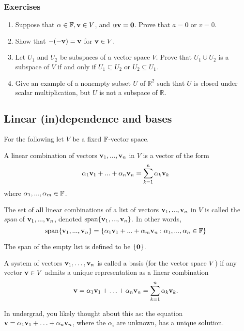 \documentclass{article}
\begin{document}
\subsubsection{Exercises}
\begin{enumerate}
    \item Suppose that $\alpha\in{\mathbb{F}}, {\mathbf{v}}\in V$, and $\alpha {\mathbf{v}}={\mathbf{0}}$. Prove that $a=0$
or $v=0$.
\item Show that $-(-{\mathbf{v}})={\mathbf{v}}$ for ${\mathbf{v}}\in V$.
\item Let $U_1$ and $U_2$ be subspaces of a vector space $V$. Prove that $U_1 \cup U_2$ is a subspace of $V$ if and only if $U_1 \subseteq U_2$ or $U_2 \subseteq U_1$.
\item Give an example of a nonempty subset $U$ of $\mathbb{R}^{2}$ such that $U$ is closed under scalar
multiplication, but $U$ is not a subspace of $\mathbb{R}$.
\end{enumerate}


\subsection{Linear (in)dependence and bases}
For the following let $V$ be a fixed ${\mathbb{F}}$-vector space.

\begin{definition}
A linear combination of vectors ${\mathbf{v}}_{1},...,{\mathbf{v}}_{n}$  in $V$ is a vector of the form 
$$
\alpha_{1}{\mathbf{v}}_{1}+...+\alpha_{n}{\mathbf{v}}_{n} = \sum_{k=1}^n \alpha_k {\mathbf{v}}_k
$$
 where $\alpha_{1},...,\alpha_{m} \in {\mathbb{F}}$.
\end{definition}

\begin{definition}
The set of all linear combinations of a list of vectors
${\mathbf{v}}_{1},...,{\mathbf{v}}_{n}$ in $V$ is called the \emph{span} of ${\mathbf{v}}_{1},...,{\mathbf{v}}_{n}$,
denoted $\mathrm{span}\{{\mathbf{v}}_{1},...,{\mathbf{v}}_{n}\}$. In other words, 
$$
\mathrm{span}\{{\mathbf{v}}_{1},...,{\mathbf{v}}_{n}\}=\{\alpha_{1}{\mathbf{v}}_{1}+...+\alpha_{m}{\mathbf{v}}_{n} :\alpha_{1},...,\alpha_{n}\in{\mathbb{F}}\}
$$
\end{definition}
The span of the empty list is defined to be $\{{\mathbf{0}}\}$.

\begin{definition}
A system of vectors ${\mathbf{v}}_1, \ldots, {\mathbf{v}}_n$ is called a basis (for the vector space $V$ ) if any vector ${\mathbf{v}} \in V$ admits a unique representation as a linear combination
$$
{\mathbf{v}} = \alpha_1 {\mathbf{v}}_1 + \ldots + \alpha_n {\mathbf{v}}_n = \sum_{k=1}^n \alpha_k {\mathbf{v}}_k.
$$
\end{definition}

In undergrad, you likely thought about this as: the equation ${\mathbf{v}} = \alpha_1 {\mathbf{v}}_1 + \ldots + \alpha_n {\mathbf{v}}_n$, where the $\alpha_i$ are unknown, has a unique solution.
\end{document}
